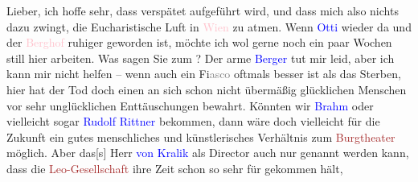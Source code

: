 \pstart{}Lieber,\pend
\pstart
           ich hoffe sehr, dass \label{K_L03559-1v}\label{K_L03559-1h} verspätet
               aufgeführt wird, und dass mich also nichts dazu zwingt, die Eucharistische Luft in
                  \textcolor{pink}{Wien}{}\ledrightnote{\textcolor{pink}{Wien}} zu atmen. Wenn \textcolor{blue}{Otti}{}\ledrightnote{\textcolor{blue}{Ottilie Salten}} wieder da und der \textcolor{pink}{Berghof}{}\ledrightnote{\textcolor{pink}{Berghof}} ruhiger geworden ist, möchte ich wol gerne noch ein paar Wochen
               still hier arbeiten. Was sagen Sie zum \label{K_L03559-2v}\label{K_L03559-2h}? Der arme \textcolor{blue}{Berger}{}\ledrightnote{\textcolor{blue}{Alfred von Berger}} tut mir leid, aber ich kann mir nicht
               helfen – wenn auch ein Fi\textcolor{gray}{asco} oftmals besser ist als das Sterben,
               hier hat der Tod doch einen an sich schon nicht übermäßig glücklichen Menschen vor
               sehr unglücklichen Enttäuschungen bewahrt. Könnten wir \textcolor{blue}{Brahm}{}\ledrightnote{\textcolor{blue}{Otto Brahm}} oder vielleicht sogar \textcolor{blue}{Rudolf Rittner}{}\ledrightnote{\textcolor{blue}{Rudolf Rittner}} bekommen, dann wäre doch vielleicht für die Zukunft ein gutes
               menschliches und künstlerisches Verhältnis zum \textcolor{brown}{Burgtheater}{}\ledrightnote{\textcolor{brown}{Burgtheater}} möglich. Aber das{[}s{]} Herr \textcolor{blue}{von Kralik}{}\ledrightnote{\textcolor{blue}{Richard Kralik}} als Director auch nur genannt werden {\pb}kann, dass die \textcolor{brown}{Leo-Gesellschaft}{}\ledrightnote{\textcolor{brown}{Österreichische Leo-Gesellschaft}} ihre Zeit schon so sehr für gekommen hält,
